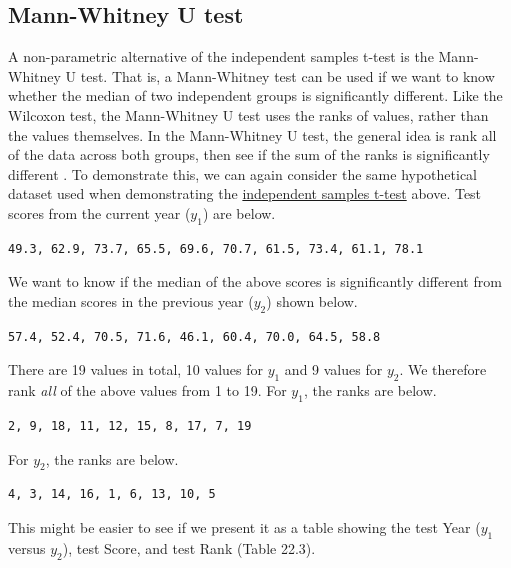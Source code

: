 \documentclass[
  openany]{scrbook}
\begin{document}
\hypertarget{mann-whitney-u-test}{%
\subsection{Mann-Whitney U test}\label{mann-whitney-u-test}}

A non-parametric alternative of the independent samples t-test is the Mann-Whitney U test.
That is, a Mann-Whitney test can be used if we want to know whether the median of two independent groups is significantly different.
Like the Wilcoxon test, the Mann-Whitney U test uses the ranks of values, rather than the values themselves.
In the Mann-Whitney U test, the general idea is rank all of the data across both groups, then see if the sum of the ranks is significantly different \citep{Sokal1995}.
To demonstrate this, we can again consider the same hypothetical dataset used when demonstrating the \protect\hyperlink{independent-samples-t-test}{independent samples t-test} above.
Test scores from the current year (\(y_{1}\)) are below.

\begin{verbatim}
49.3, 62.9, 73.7, 65.5, 69.6, 70.7, 61.5, 73.4, 61.1, 78.1
\end{verbatim}

We want to know if the median of the above scores is significantly different from the median scores in the previous year (\(y_{2}\)) shown below.

\begin{verbatim}
57.4, 52.4, 70.5, 71.6, 46.1, 60.4, 70.0, 64.5, 58.8
\end{verbatim}

There are 19 values in total, 10 values for \(y_{1}\) and 9 values for \(y_{2}\).
We therefore rank \emph{all} of the above values from 1 to 19.
For \(y_{1}\), the ranks are below.

\begin{verbatim}
2, 9, 18, 11, 12, 15, 8, 17, 7, 19
\end{verbatim}

For \(y_{2}\), the ranks are below.

\begin{verbatim}
4, 3, 14, 16, 1, 6, 13, 10, 5
\end{verbatim}

This might be easier to see if we present it as a table showing the test Year (\(y_{1}\) versus \(y_{2}\)), test Score, and test Rank (Table 22.3).
\end{document}
